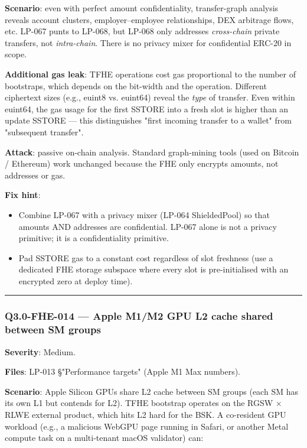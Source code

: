\documentclass[
]{article}
\providecommand{\tightlist}{%
  \setlength{\itemsep}{0pt}\setlength{\parskip}{0pt}}
\begin{document}
\textbf{Scenario}: even with perfect amount confidentiality,
transfer-graph analysis reveals account clusters, employer--employee
relationships, DEX arbitrage flows, etc. LP-067 punts to LP-068, but
LP-068 only addresses \emph{cross-chain} private transfers, not
\emph{intra-chain}. There is no privacy mixer for confidential ERC-20 in
scope.

\textbf{Additional gas leak}: TFHE operations cost gas proportional to
the number of bootstraps, which depends on the bit-width and the
operation. Different ciphertext sizes (e.g., euint8 vs. euint64) reveal
the \emph{type} of transfer. Even within euint64, the gas usage for the
first SSTORE into a fresh slot is higher than an update SSTORE --- this
distinguishes "first incoming transfer to a wallet" from "subsequent
transfer".

\textbf{Attack}: passive on-chain analysis. Standard graph-mining tools
(used on Bitcoin / Ethereum) work unchanged because the FHE only
encrypts amounts, not addresses or gas.

\textbf{Fix hint}:

\begin{itemize}
\tightlist
\item
  Combine LP-067 with a privacy mixer (LP-064 ShieldedPool) so that
  amounts AND addresses are confidential. LP-067 alone is not a privacy
  primitive; it is a confidentiality primitive.
\item
  Pad SSTORE gas to a constant cost regardless of slot freshness (use a
  dedicated FHE storage subspace where every slot is pre-initialised
  with an encrypted zero at deploy time).
\end{itemize}

\begin{center}\rule{0.5\linewidth}{0.5pt}\end{center}

\subsubsection{Q3.0-FHE-014 --- Apple M1/M2 GPU L2 cache shared between
SM
groups}\label{q30-fhe-014--apple-m1m2-gpu-l2-cache-shared-between-sm-groups}

\textbf{Severity}: Medium.

\textbf{Files}: LP-013 §"Performance targets" (Apple M1 Max numbers).

\textbf{Scenario}: Apple Silicon GPUs share L2 cache between SM groups
(each SM has its own L1 but contends for L2). TFHE bootstrap operates on
the RGSW × RLWE external product, which hits L2 hard for the BSK. A
co-resident GPU workload (e.g., a malicious WebGPU page running in
Safari, or another Metal compute task on a multi-tenant macOS validator)
can:
\end{document}
